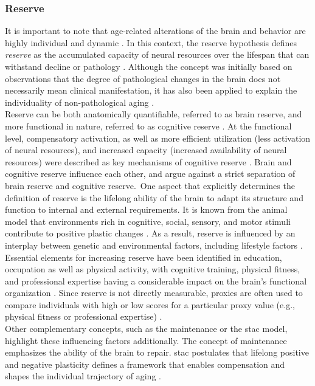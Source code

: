 \subsubsection{Reserve}
\label{theory:aging:reserve}
It is important to note that age-related alterations of the brain and behavior are highly individual and dynamic \cite{Smith2020,Koen2019,Douw2014}. In this context, the reserve hypothesis defines \textit{reserve} as the accumulated capacity of neural resources over the lifespan that can withstand decline or pathology \cite{Cabeza2018, Stern2009}. Although the concept was initially based on observations that the degree of pathological changes in the brain does not necessarily mean clinical manifestation, it has also been applied to explain the individuality of non-pathological aging \cite{Esiri2001,Cabeza2018,Stern2009}.\\
Reserve can be both anatomically quantifiable, referred to as brain reserve, and more functional in nature, referred to as cognitive reserve \cite{Stern2009}. At the functional level, compensatory activation, as well as more efficient utilization (less activation of neural resources), and increased capacity (increased availability of neural resources) were described as key mechanisms of cognitive reserve \cite{Stern2004,Stern2009}. Brain and cognitive reserve influence each other, and \citeauthor{Cabeza2018} \cite{Cabeza2018} argue against a strict separation of brain reserve and cognitive reserve.\
One aspect that explicitly determines the definition of reserve is the lifelong ability of the brain to adapt its structure and function to internal and external requirements. It is known from the animal model that environments rich in cognitive, social, sensory, and motor stimuli contribute to positive plastic changes \cite{Fabel2009}. As a result, reserve is influenced by an interplay between genetic and environmental factors, including lifestyle factors \cite{Cabeza2018}. Essential elements for increasing reserve have been identified in education, occupation as well as physical activity, with cognitive training, physical fitness, and professional expertise having a considerable impact on the brain's functional organization \cite{Vieluf2018,VOSS2016113,Soldan2021}. Since reserve is not directly measurable, proxies are often used to compare individuals with high or low scores for a particular proxy value (e.g., physical fitness or professional expertise) \cite{Cabeza2018}.\\
Other complementary concepts, such as the maintenance or the \gls{stac} model, highlight these influencing factors additionally. The concept of maintenance emphasizes the ability of the brain to repair. \Gls{stac} postulates that lifelong positive and negative plasticity defines a framework that enables compensation and shapes the individual trajectory of aging \cite{Reuter-Lorenz2014}. 

